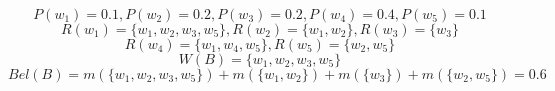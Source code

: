 \documentclass{article}
\begin{document}
$$P(w_1) = 0.1, P(w_2) = 0.2, P(w_3) = 0.2, P(w_4) = 0.4, P(w_5) = 0.1$$
$$R(w_1) = \{w_1, w_2, w_3, w_5\}, R(w_2) = \{ w_1, w_2 \}, R(w_3) = \{ w_3 \}$$
$$R(w_4) = \{w_1, w_4, w_5 \}, R(w_5) = \{ w_2, w_5 \}$$
$$W(B) = \{w_1, w_2, w_3, w_5 \}$$
$$Bel(B) = m(\{w_1, w_2, w_3, w_5 \}) + m(\{ w_1, w_2 \}) + m(\{ w_3 \}) + m(\{ w_2, w_5 \}) = 0.6$$
\end{document}

